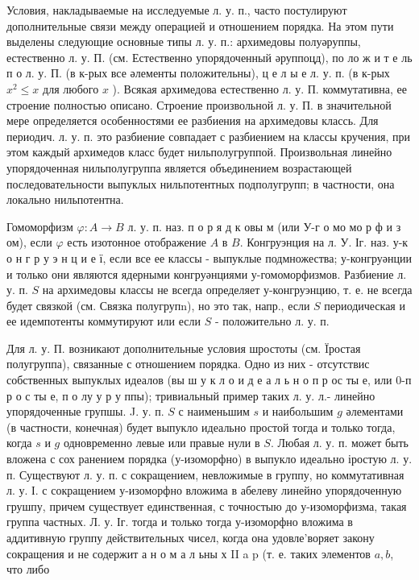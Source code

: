 \documentclass[10pt]{article}
\begin{document}
Условия, накладываемые на исследуемые л. у. п., часто постулируют дополнительные связи между операцией и отношением порядка. На этом пути выделены следующие основные типы л. у. п.: архимедовы полуәруппы, естественно л. у. П. (см. Естественно упорядоченный әруппоцд), по ло ж и т е ль п о л. у. П. (в к-рых все әлементы положительны), ц е л ы е л. у. п. (в к-рых $x^{2} \leqslant x$ для любого $x$ ). Всякая архимедова естественно л. у. П. коммутативна, ее строение полностью описано. Строение произвольной л. у. П. в значительной мере определяется особенностями ее разбиения на архимедовы классь. Для периодич. л. у. п. это разбиение совпадает с разбиением на классы кручения, при этом каждый архимедов класс будет нильполугруппой. Произвольная линейно упорядоченная нильполугруппа является объединением возрастающей последовательности выпуклых нильпотентных подполугрупп; в частности, она локально нильпотентна.



Гомоморфизм $\varphi: A \rightarrow B$ л. у. п. наз. п о р я д к овы м (или У-г о мо мо р ф и з ом), если $\varphi$ есть изотонное отображение $A$ в $B$. Конгруэнция на л. У. Іг. наз. у-к о н г р у э н ц и е ї, если все ее классы - выпуклые подмножества; у-конгруәнции и только они являются ядерными конгруәнциями у-гомоморфизмов. Разбиение л. у. п. $S$ на архимедовы классы не всегда определяет у-конгруэнцию, т. е. не всегда будет связкой (см. Связка полугрупn), но это так, напр., если $S$ периодическая и ее идемпотенты коммутируют или если $S$ - положительно л. у. п.



Для л. у. П. возникают дополнительные условия шростоты (см. Ïростая полугруппа), связанные с отношением порядка. Одно из них - отсутствис собственных выпуклых идеалов (вы ш у к л о и д е а л ь н о п р ос ты е, или 0-п р о с ты е, п о лу у р у ппы); тривиальный пример таких л. у. л.- линейно упорядоченные групшы. J. у. п. $S$ с наименьшим $s$ и наибольшим $g$ әлементами (в частности, конечная) будет выпукло идеально простой тогда и только тогда, когда $s$ и $g$ одновременно левые или правые нули в $S$. Любая л. у. п. может быть вложена с сох ранением порядка (у-изоморфно) в выпукло идеально іростую л. у. п. Существуют л. у. п. с сокращением, невложимые в группу, но коммутативная л. у. І. с сокращением у-изоморфно вложима в абелеву линейно упорядоченную грушпу, причем существует единственная, с точностыю до у-изоморфизма, такая группа частных. Л. у. Іг. тогда и только тогда у-изоморфно вложима в аддитивную группу действительных чисел, когда она удовле'воряет закону сокращения и не содержит а н о м а л ьны х II a p (т. е. таких элементов $a, b$, что либо
\end{document}
